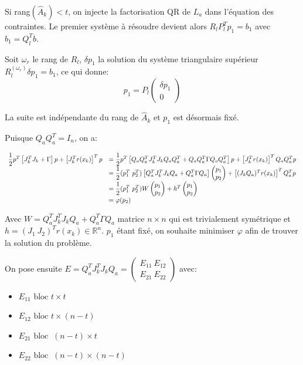 \documentclass[a4paper,11pt]{article}
\newcommand{\ha}{\hat{A}}
\numberwithin{equation}{section}
\begin{document}
Si rang$(\ha_{k})<t$, on injecte la factorisation QR de $L_{a}$ dans l'équation des contraintes. Le premier système à résoudre devient alors $R_lP_l^Tp_1 = b_1$ avec $b_{1}=Q_l^{T}b$. 

Soit $\omega_{r}$ le rang de $R_l$, $\delta p_{1}$ la solution du système triangulaire supérieur $R_l^{(\omega_{r})}\delta p_{1} = b_{1}$, ce qui donne:
$$ p_{1} = P_l \begin{pmatrix} \delta p_{1} \\ 0 \end{pmatrix}$$

La suite est indépendante du rang de $\ha_{k}$ et $p_{1}$ est désormais fixé.

Puisque $Q_{a}Q_{a}^T = I_n$, on a:

$$
\begin{array}{l l l l} 
\dfrac{1}{2}p^T\left[J_{k}^TJ_{k} + \Gamma\right]p + \left[J_{k}^Tr(x_{k})\right]^Tp &= \dfrac{1}{2}p^T\left[Q_{a}Q_{a}^TJ_{k}^TJ_{k}Q_{a}Q_{a}^T + Q_{a}Q_{a}^T\Gamma Q_{a}Q_{a}^T\right]p + \left[J_{k}^Tr(x_{k})\right]^TQ_{a}Q_{a}^Tp \\
&= \dfrac{1}{2}(p_1^T\ p_2^T) \left[Q_{a}^TJ_{k}^TJ_{k}Q_{a} + Q_{a}^T\Gamma Q_{a}\right]\begin{pmatrix} p_1 \\ p_2\end{pmatrix} + \left[(J_{k}Q_{a})^Tr(x_{k})\right]^TQ_{a}^{T}p\\
&= \dfrac{1}{2}(p_1^T\ p_2^T)W\begin{pmatrix}p_1\\p_2\end{pmatrix} + h^T\begin{pmatrix}p_1\\p_2\end{pmatrix} \\
&= \varphi(p_2)
\end{array}
$$

Avec $W = Q_{a}^TJ_{k}^TJ_{k}Q_{a} + Q_{a}^T\Gamma Q_{a}$ matrice $n\times n$ qui est trivialement symétrique et $h = (J_1\ J_2)^Tr(x_{k}) \in \mathbb{R}^n$. $p_1$ étant fixé, on souhaite minimiser $\varphi$ afin de trouver la solution du problème.

On pose ensuite $E =  Q_{a}^TJ_{k}^TJ_{k}Q_{a} = \begin{pmatrix} E_{11}\ E_{12} \\ E_{21}\ E_{22} \end{pmatrix}$ avec:
\begin{itemize}
\item
$E_{11} \text{ bloc } t\times t$
\item
$E_{12} \text{ bloc } t\times (n-t)$
\item
$E_{21}\text{ bloc } \ (n-t)\times t$
\item
$E_{22}\text{ bloc }\ (n-t)\times (n-t)$
\end{itemize}
\end{document}

